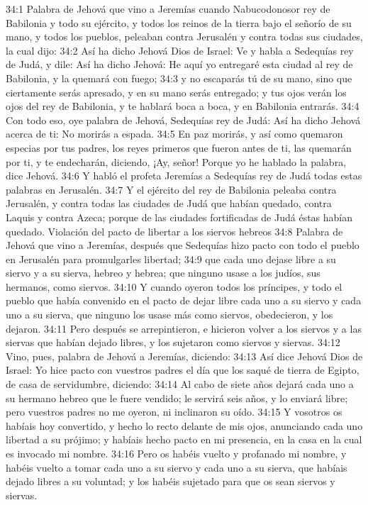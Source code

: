 34:1 Palabra de Jehová que vino a Jeremías cuando Nabucodonosor rey de Babilonia y todo su ejército, y todos los reinos de la tierra bajo el señorío de su mano, y todos los pueblos, peleaban contra Jerusalén y contra todas sus ciudades, la cual dijo: 
34:2 Así ha dicho Jehová Dios de Israel: Ve y habla a Sedequías rey de Judá, y dile: Así ha dicho Jehová: He aquí yo entregaré esta ciudad al rey de Babilonia, y la quemará con fuego; 
34:3 y no escaparás tú de su mano, sino que ciertamente serás apresado, y en su mano serás entregado; y tus ojos verán los ojos del rey de Babilonia, y te hablará boca a boca, y en Babilonia entrarás. 
34:4 Con todo eso, oye palabra de Jehová, Sedequías rey de Judá: Así ha dicho Jehová acerca de ti: No morirás a espada. 
34:5 En paz morirás, y así como quemaron especias por tus padres, los reyes primeros que fueron antes de ti, las quemarán por ti, y te endecharán, diciendo, ¡Ay, señor! Porque yo he hablado la palabra, dice Jehová. 
34:6 Y habló el profeta Jeremías a Sedequías rey de Judá todas estas palabras en Jerusalén. 
34:7 Y el ejército del rey de Babilonia peleaba contra Jerusalén, y contra todas las ciudades de Judá que habían quedado, contra Laquis y contra Azeca; porque de las ciudades fortificadas de Judá éstas habían quedado. 
Violación del pacto de libertar a los siervos hebreos 
34:8 Palabra de Jehová que vino a Jeremías, después que Sedequías hizo pacto con todo el pueblo en Jerusalén para promulgarles libertad; 
34:9 que cada uno dejase libre a su siervo y a su sierva, hebreo y hebrea; que ninguno usase a los judíos, sus hermanos, como siervos. 
34:10 Y cuando oyeron todos los príncipes, y todo el pueblo que había convenido en el pacto de dejar libre cada uno a su siervo y cada uno a su sierva, que ninguno los usase más como siervos, obedecieron, y los dejaron. 
34:11 Pero después se arrepintieron, e hicieron volver a los siervos y a las siervas que habían dejado libres, y los sujetaron como siervos y siervas. 
34:12 Vino, pues, palabra de Jehová a Jeremías, diciendo: 
34:13 Así dice Jehová Dios de Israel: Yo hice pacto con vuestros padres el día que los saqué de tierra de Egipto, de casa de servidumbre, diciendo: 
34:14 Al cabo de siete años dejará cada uno a su hermano hebreo que le fuere vendido; le servirá seis años, y lo enviará libre; pero vuestros padres no me oyeron, ni inclinaron su oído. 
34:15 Y vosotros os habíais hoy convertido, y hecho lo recto delante de mis ojos, anunciando cada uno libertad a su prójimo; y habíais hecho pacto en mi presencia, en la casa en la cual es invocado mi nombre. 
34:16 Pero os habéis vuelto y profanado mi nombre, y habéis vuelto a tomar cada uno a su siervo y cada uno a su sierva, que habíais dejado libres a su voluntad; y los habéis sujetado para que os sean siervos y siervas. 
